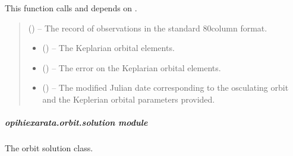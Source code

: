 \documentclass[letterpaper,11pt,english]{sphinxmanual}
\begin{document}
\begin{savenotes}
\begin{fulllineitems}
\begin{savenotes}
\begin{fulllineitems}
\begin{description}
\end{description}

\sphinxAtStartPar
This function calls and depends on .
\begin{quote}\begin{description}
\sphinxAtStartPar
{} () – The record of observations in the standard 80\sphinxhyphen{}column format.

\sphinxAtStartPar
\begin{itemize}
\item {} 
\sphinxAtStartPar
{} () – The Keplarian orbital elements.

\item {} 
\sphinxAtStartPar
{} () – The error on the Keplarian orbital elements.

\item {} 
\sphinxAtStartPar
{} () – The modified Julian date corresponding to the osculating orbit and
the Keplerian orbital parameters provided.

\end{itemize}


\end{description}\end{quote}

\end{fulllineitems}\end{savenotes}


\end{fulllineitems}\end{savenotes}


\sphinxstepscope


\subparagraph{opihiexarata.orbit.solution module}
\label{\detokenize{code/opihiexarata.orbit.solution:module-opihiexarata.orbit.solution}}\label{\detokenize{code/opihiexarata.orbit.solution:opihiexarata-orbit-solution-module}}\label{\detokenize{code/opihiexarata.orbit.solution::doc}}
\sphinxAtStartPar
The orbit solution class.
\end{document}
